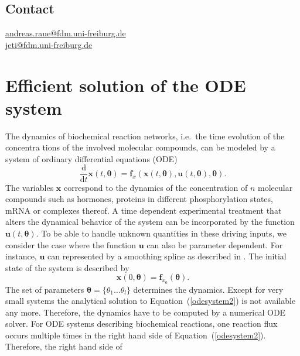 \documentclass[12pt,a4paper]{scrartcl}
\newcommand{\DD}[2]{\frac{\mathrm{d} #1}{\mathrm{d} #2}}
\begin{document}
\subsection*{Contact}
\href{andreas.raue@fdm.uni-freiburg.de}{andreas.raue@fdm.uni-freiburg.de} \\
\href{jeti@fdm.uni-freiburg.de}{jeti@fdm.uni-freiburg.de}

\renewcommand*\contentsname{Contents}
\tableofcontents

\section{Efficient solution of the ODE system} \label{sec:ode_solvers}

The dynamics of biochemical reaction networks, i.e.~the time evolution of the concentra\-
tions of the involved molecular compounds, can be modeled by a system of ordinary 
differential equations (ODE)
\begin{equation}
	\DD{}{t}{\mathbf{x}}(t, \boldsymbol{\theta}) = \mathbf{f}_{x}(\mathbf{x}(t, 
\boldsymbol{\theta}), \mathbf{u}(t, \boldsymbol{\theta}), \boldsymbol{\theta}). 
\label{odesystem2}
\end{equation}
The variables $\mathbf{x}$ correspond to the dynamics of the concentration of $n$ 
molecular compounds such as hormones, proteins in different phosphorylation states, 
mRNA or complexes thereof. A time dependent experimental treatment that alters the 
dynamical behavior of the system can be incorporated by the function $\mathbf{u}(t, 
\boldsymbol{\theta})$. To be able to handle unknown quantities in these driving inputs, we 
consider the case where the function $\mathbf{u}$ can also be parameter dependent. For 
instance, $\mathbf{u}$ can represented by a smoothing spline as described in 
\citet{Schelker:2012uq}. The initial state of the system is described by 
\begin{equation}
	\mathbf{x}(0, \boldsymbol{\theta}) = \mathbf{f}_{x_0}(\boldsymbol{\theta}). 
\label{init_ode_sys}
\end{equation}	
The set of parameters $\boldsymbol{\theta} = \{\theta_1 \dots \theta_l\}$ determines the  
dynamics. Except for very small systems the analytical solution to Equation~(\ref{odesystem2}) is 
not available any more. Therefore, the dynamics have to be computed by a numerical ODE 
solver. For ODE systems describing biochemical reactions, one reaction flux occurs multiple times in the right 
hand side of Equation~(\ref{odesystem2}). Therefore, the right hand side of 
\end{document}
